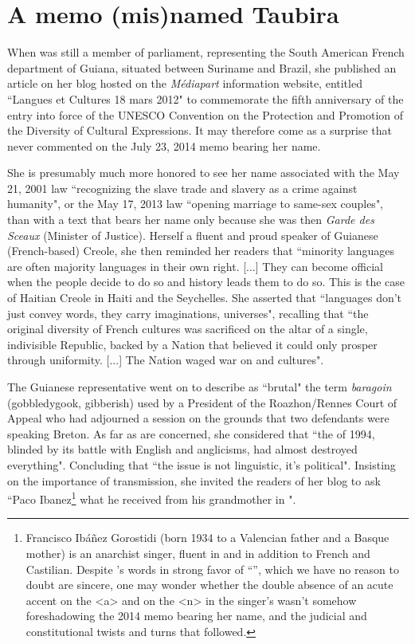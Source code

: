 \documentclass[output=paper,colorlinks,citecolor=brown]{langscibook}
\begin{document}
\section{A memo (mis)named Taubira}

When  was still a member of parliament, representing the South American French department of Guiana, situated between Suriname and Brazil, she published an article on her blog hosted on the \textit{Médiapart} information website, entitled ``Langues et Cultures 18 mars 2012" \citep{sm:Taubira2012} to commemorate the fifth anniversary of the entry into force of the UNESCO Convention on the Protection and Promotion of the Diversity of Cultural Expressions. It may therefore come as a surprise that  never commented on the July 23, 2014 memo bearing her name. 

She is presumably much more honored to see her name associated with the May 21, 2001 law ``recognizing the slave trade and slavery as a crime against humanity", or the May 17, 2013 law ``opening marriage to same-sex couples", than with a text that bears her name only because she was then \textit{Garde des Sceaux} (Minister of Justice). Herself a fluent and proud speaker of Guianese (French-based) Creole, she then reminded her readers that ``minority languages are often majority languages in their own right. [...] They can become official when the people decide to do so and history leads them to do so. This is the case of Haitian Creole in Haiti and the Seychelles. She asserted that ``languages don't just convey words, they carry imaginations, universes", recalling that ``the original diversity of French cultures was sacrificed on the altar of a single, indivisible Republic, backed by a Nation that believed it could only prosper through uniformity. [...] The Nation waged war on  and cultures". 

The Guianese representative went on to describe as ``brutal" the term \textit{baragoin} (gobbledygook, gibberish) used by a President of the Roazhon/Rennes Court of Appeal who had adjourned a session on the grounds that two defendants were speaking Breton. As far as  are concerned, she considered that ``the  of 1994, blinded by its battle with English and anglicisms, had almost destroyed everything". Concluding that ``the issue is not linguistic, it's political". Insisting on the importance of transmission, she invited the readers of her blog to ask ``Paco Ibanez\footnote{Francisco Ibáñez Gorostidi (born 1934 to a Valencian father and a Basque mother) is an anarchist singer, fluent in  and  in addition to French and Castilian. Despite 's words in strong favor of ``”, which we have no reason to doubt are sincere, one may wonder whether the double absence of an acute accent on the <a> and  on the <n> in the singer’s  wasn’t somehow foreshadowing the 2014 memo bearing her name, and the judicial and constitutional twists and turns that followed.} what he received from his grandmother in ". 
\end{document}
